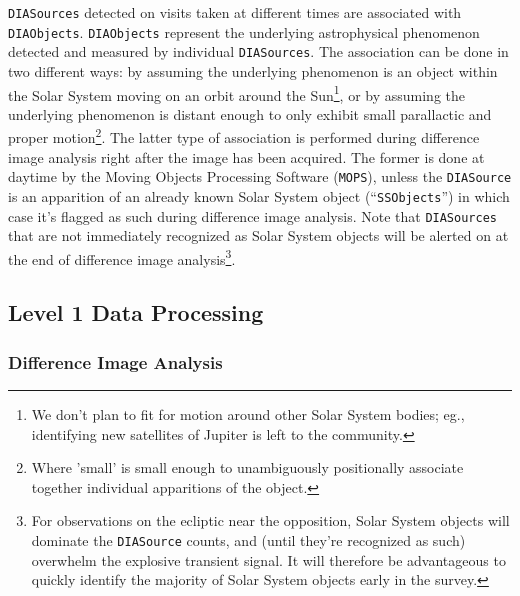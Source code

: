 \documentclass[12pt]{article}
\newcommand{\code}[1]{\texttt{#1}}
\newcommand{\DIASource}{\code{DIASource}\xspace}
\newcommand{\DIASources}{\code{DIASources}\xspace}
\newcommand{\DIAObjects}{\code{DIAObjects}\xspace}
\newcommand{\SSObjects}{\code{SSObjects}\xspace}
\begin{document}
\DIASources detected on visits taken at different times are associated with \DIAObjects. \DIAObjects represent the underlying astrophysical phenomenon detected and measured by individual \DIASources. The association can be done in two different ways: by assuming the underlying phenomenon is an object within the Solar System moving on an orbit around the Sun\footnote{We don't plan to fit for motion around other Solar System bodies; eg., identifying new satellites of Jupiter is left to the community.}, or by assuming the underlying phenomenon is distant enough to only exhibit small parallactic and proper motion\footnote{Where 'small' is small enough to unambiguously positionally associate together individual apparitions of the object.}. The latter type of association is performed during difference image analysis right after the image has been acquired. The former is done at daytime by the Moving Objects Processing Software (\code{MOPS}), unless the \DIASource is an apparition of an already known Solar System object (``\SSObjects'') in which case it's flagged as such during difference image analysis. Note that \DIASources that are not immediately recognized as Solar System objects will be alerted on at the end of difference image analysis\footnote{For observations on the ecliptic near the opposition, Solar System objects will dominate the \DIASource counts, and (until they're recognized as such) overwhelm the explosive transient signal. It will therefore be advantageous to quickly identify the majority of Solar System objects early in the survey.}.

\subsection{Level 1 Data Processing}

\subsubsection{Difference Image Analysis}
\label{sec:dia}
\end{document}
